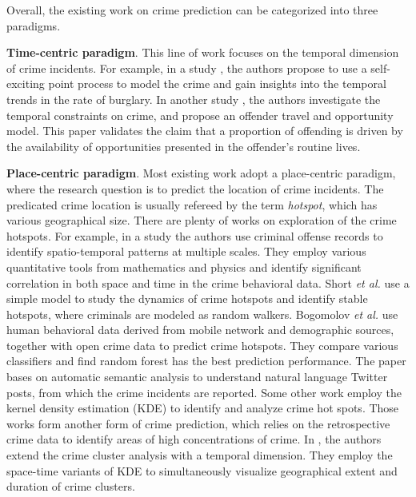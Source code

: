 Overall, the existing work on crime prediction can be categorized into three paradigms.



\textbf{Time-centric paradigm}. This line of work focuses on the temporal dimension of crime incidents. For example, in a study \cite{MSBS+12}, the authors propose to use a self-exciting point process to model the crime and gain insights into the temporal trends in the rate of burglary. In another study \cite{Ratc06}, the authors investigate the temporal constraints on crime, and propose an offender travel and opportunity model. This paper validates the claim that a proportion of offending is driven by the availability of opportunities presented in the offender's routine lives. 


\textbf{Place-centric paradigm}. Most existing work adopt a place-centric paradigm, where the research question is to predict the location of  crime incidents.  The predicated crime location is usually refereed by the term \emph{hotspot}, which has various geographical size.  There are plenty of works on exploration of the crime hotspots. For example, in a study \cite{TEP11} the authors  use criminal offense records to identify spatio-temporal patterns at multiple scales. They employ various quantitative tools from mathematics and physics and identify significant correlation in both space and time in the crime behavioral data.  Short \emph{et al.} \cite{SDPT+08} use a simple model to study the dynamics of crime hotspots and identify stable hotspots, where criminals are modeled as random walkers.  Bogomolov \emph{et al.} \cite{Bogo14} use human behavioral data derived from mobile network and demographic sources, together with open crime data to predict crime hotspots. They compare various classifiers and find random forest has the best prediction performance. The paper \cite{WGB12} bases on automatic semantic analysis to understand natural language Twitter posts, from which the crime incidents are reported. Some other work \cite{CTU08,ECCW05} employ the kernel density estimation (KDE) to identify and analyze crime hot spots. Those works form another form of crime prediction, which relies on the retrospective crime data to identify areas of high concentrations of crime. In  \cite{NaYa14}, the authors extend the crime cluster analysis with a temporal dimension. They employ the space-time variants of KDE to simultaneously visualize geographical extent and duration of crime clusters. 




